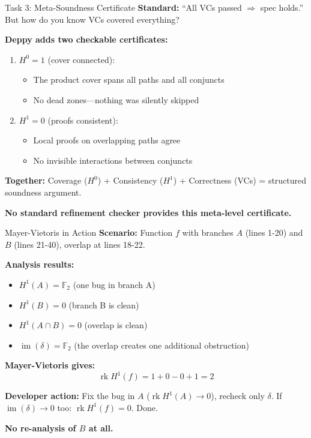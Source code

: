 \documentclass[aspectratio=169,10pt]{beamer}
\newcommand{\im}{\operatorname{im}}
\newcommand{\rk}{\operatorname{rk}}
\begin{document}
\begin{frame}{Task 3: Meta-Soundness Certificate}
\textbf{Standard:} ``All VCs passed $\Rightarrow$ spec holds.'' But how do you know VCs covered everything?

\textbf{Deppy adds two checkable certificates:}
\begin{enumerate}
  \item \textbf{$H^0 = 1$} (cover connected):
  \begin{itemize}
    \item The product cover spans all paths and all conjuncts
    \item No dead zones---nothing was silently skipped
  \end{itemize}

  \item \textbf{$H^1 = 0$} (proofs consistent):
  \begin{itemize}
    \item Local proofs on overlapping paths agree
    \item No invisible interactions between conjuncts
  \end{itemize}
\end{enumerate}

\textbf{Together:} Coverage ($H^0$) + Consistency ($H^1$) + Correctness (VCs) = structured soundness argument.

\textbf{No standard refinement checker provides this meta-level certificate.}
\end{frame}

\begin{frame}{Mayer-Vietoris in Action}
\textbf{Scenario:} Function $f$ with branches $A$ (lines 1-20) and $B$ (lines 21-40), overlap at lines 18-22.

\textbf{Analysis results:}
\begin{itemize}
  \item $H^1(A) = \mathbb{F}_2$ (one bug in branch A)
  \item $H^1(B) = 0$ (branch B is clean)
  \item $H^1(A \cap B) = 0$ (overlap is clean)
  \item $\im(\delta) = \mathbb{F}_2$ (the overlap creates one additional obstruction)
\end{itemize}

\textbf{Mayer-Vietoris gives:}
\[
\rk H^1(f) = 1 + 0 - 0 + 1 = 2
\]

\textbf{Developer action:} Fix the bug in $A$ ($\rk H^1(A) \to 0$), recheck only $\delta$.
If $\im(\delta) \to 0$ too: $\rk H^1(f) = 0$. Done.

\textbf{No re-analysis of $B$ at all.}
\end{frame}
\end{document}
